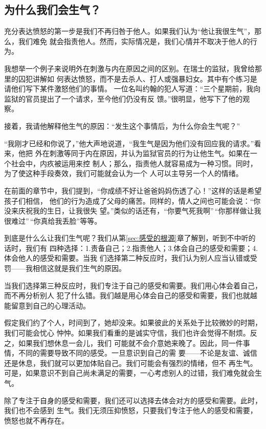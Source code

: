\documentclass{ctexart}
\newcommand{\secref}[1]{第\ref{#1}章}
\begin{document}
\subsection{为什么我们会生气？}

充分表达愤怒的第一步是我们不再归咎于他人。如果我们认为``他让我很生气''，那么，我们难免
就会指责他人。然而，实际情况是，我们心情并不取决于他人的行为。

我想举一个例子来说明外在刺激与内在原因之间的区别。在瑞士的监狱，我曾给那里的囚犯讲解如
何表达愤怒，而不是去杀人、打人或强暴妇女。其中有个练习是请他们写下某件激怒他们的事情。
一位名叫约翰的犯人写道：``三个星期前，我向监狱的官员提出了一个请求，至今他们仍没有反
馈。''很明显，他写下了他的观察。

接着，我请他解释他生气的原因：``发生这个事情后，为什么你会生气呢？''

``我刚才已经和你说了，''他大声地说道，``我生气是因为他们没有回应我的请求。''看来，他把
外在刺激等同于内在原因，并认为监狱官员的行为让他生气。如果在一个社会中，内疚被运用来控
制人；那么，指责他人就容易成为一种习惯。同时，为了使这种手段奏效，我们可能就会认为一个
人可以主导另一个人的情绪。

在前面的章节中，我们提到，``你成绩不好让爸爸妈妈伤透了心！''这样的话是希望孩子们相信，
他们的行为造成了父母的痛苦。同样的，情人之间也可能会说：``你没来庆祝我的生日，让我很失
望。''类似的话还有，``你要气死我啊''\,``你那样做让我很难过''\,``你真给我丢脸''等等。

到底是什么么让我们生气呢？我们从\secref{sec:感受的根源}了解到，听到不中听的话时，我们有
四种选择：1.责备自己；2.指责他人；3.体会自己的感受和需要；4.体会他人的感受和需要。当我
们选择第二种反应时，我们认为别人应当认错或受罚------我相信这就是我们生气的原因。

当我们选择第三种反应时，我们专注于自己的感受和需要。我们用心体会着自己，而不再分析别人
犯了什么错。我们越是用心体会自己的感受和需要，我们也就越能留意到自己的心理活动。

假定我们约了个人，时间到了，她却没来。如果彼此的关系处于比较微妙的时期，我们可能会忧心
忡忡。如果我们看重的是诚实守信，我们也许会觉得不耐烦。反之，如果我们想休息一会儿，我们
可能就不会介意她来晚了。因此，同一件事情，不同的需要导致不同的感受。一旦意识到自己的需
要------不论是友谊、诚信还是休息，我们就可以更加体贴自己。我们可能会有强烈的情绪，但不
再生气。可是，如果意识不到自己尚未满足的需要，一心考虑别人的过错，我们难免就会生气。

除了专注于自身的感受和需要，我们还可以选择去体会对方的感受和需要。此时，我们也不会感到
生气。我们无须压抑愤怒，只要我们专注于他人的感受和需要，愤怒也就不再存在。
\end{document}
